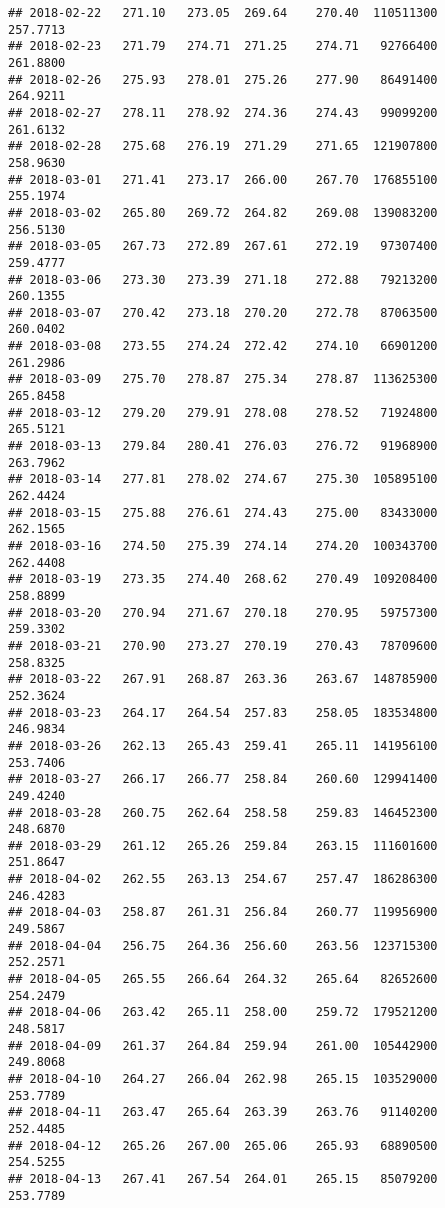\documentclass[
]{article}
\begin{document}
\begin{verbatim}
## 2018-02-22   271.10   273.05  269.64    270.40  110511300     257.7713
## 2018-02-23   271.79   274.71  271.25    274.71   92766400     261.8800
## 2018-02-26   275.93   278.01  275.26    277.90   86491400     264.9211
## 2018-02-27   278.11   278.92  274.36    274.43   99099200     261.6132
## 2018-02-28   275.68   276.19  271.29    271.65  121907800     258.9630
## 2018-03-01   271.41   273.17  266.00    267.70  176855100     255.1974
## 2018-03-02   265.80   269.72  264.82    269.08  139083200     256.5130
## 2018-03-05   267.73   272.89  267.61    272.19   97307400     259.4777
## 2018-03-06   273.30   273.39  271.18    272.88   79213200     260.1355
## 2018-03-07   270.42   273.18  270.20    272.78   87063500     260.0402
## 2018-03-08   273.55   274.24  272.42    274.10   66901200     261.2986
## 2018-03-09   275.70   278.87  275.34    278.87  113625300     265.8458
## 2018-03-12   279.20   279.91  278.08    278.52   71924800     265.5121
## 2018-03-13   279.84   280.41  276.03    276.72   91968900     263.7962
## 2018-03-14   277.81   278.02  274.67    275.30  105895100     262.4424
## 2018-03-15   275.88   276.61  274.43    275.00   83433000     262.1565
## 2018-03-16   274.50   275.39  274.14    274.20  100343700     262.4408
## 2018-03-19   273.35   274.40  268.62    270.49  109208400     258.8899
## 2018-03-20   270.94   271.67  270.18    270.95   59757300     259.3302
## 2018-03-21   270.90   273.27  270.19    270.43   78709600     258.8325
## 2018-03-22   267.91   268.87  263.36    263.67  148785900     252.3624
## 2018-03-23   264.17   264.54  257.83    258.05  183534800     246.9834
## 2018-03-26   262.13   265.43  259.41    265.11  141956100     253.7406
## 2018-03-27   266.17   266.77  258.84    260.60  129941400     249.4240
## 2018-03-28   260.75   262.64  258.58    259.83  146452300     248.6870
## 2018-03-29   261.12   265.26  259.84    263.15  111601600     251.8647
## 2018-04-02   262.55   263.13  254.67    257.47  186286300     246.4283
## 2018-04-03   258.87   261.31  256.84    260.77  119956900     249.5867
## 2018-04-04   256.75   264.36  256.60    263.56  123715300     252.2571
## 2018-04-05   265.55   266.64  264.32    265.64   82652600     254.2479
## 2018-04-06   263.42   265.11  258.00    259.72  179521200     248.5817
## 2018-04-09   261.37   264.84  259.94    261.00  105442900     249.8068
## 2018-04-10   264.27   266.04  262.98    265.15  103529000     253.7789
## 2018-04-11   263.47   265.64  263.39    263.76   91140200     252.4485
## 2018-04-12   265.26   267.00  265.06    265.93   68890500     254.5255
## 2018-04-13   267.41   267.54  264.01    265.15   85079200     253.7789

\end{verbatim}
\end{document}
